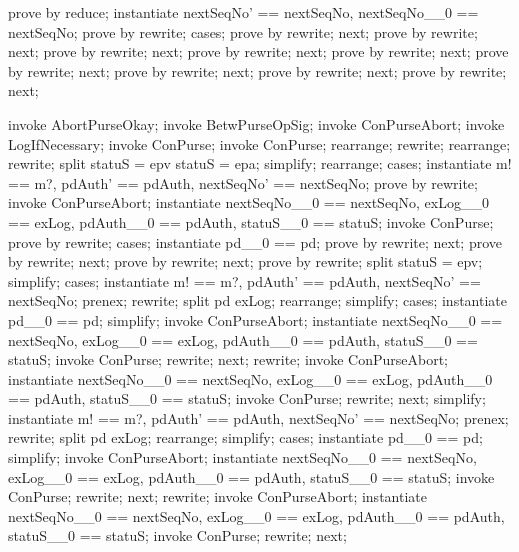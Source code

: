 \begin{LPScript}\begin{zproof}[tIncreasePurseOkayIsTotal]
    prove by reduce;
    instantiate nextSeqNo' == nextSeqNo, nextSeqNo\_\_0 == nextSeqNo;
    prove by rewrite;
    cases;
    prove by rewrite;
    next;
    prove by rewrite;
    next;
    prove by rewrite;
    next;
    prove by rewrite;
    next;
    prove by rewrite;
    next;
    prove by rewrite;
    next;
    prove by rewrite;
    next;
    prove by rewrite;
    next;
    prove by rewrite;
    next;
\end{zproof}\end{LPScript}

\begin{LPScript}\begin{zproof}[tAbortPurseOkayIsTotal]
    invoke AbortPurseOkay;
    invoke BetwPurseOpSig;
    invoke \Xi ConPurseAbort;
    invoke LogIfNecessary;
    invoke \Delta ConPurse;
    invoke ConPurse;
    rearrange;
    rewrite;
    rearrange;
    rewrite;
    split \lnot  statuS = epv \land  \lnot  statuS = epa;
    simplify;
    rearrange;
    cases;
    instantiate m! == m?, pdAuth' == pdAuth, nextSeqNo' == nextSeqNo;
    prove by rewrite;
    invoke ConPurseAbort;
    instantiate nextSeqNo\_\_0 == nextSeqNo, exLog\_\_0 == exLog,
        pdAuth\_\_0 == pdAuth, statuS\_\_0 == statuS;
    invoke ConPurse;
    prove by rewrite;
    cases;
    instantiate pd\_\_0 == pd;
    prove by rewrite;
    next;
    prove by rewrite;
    next;
    prove by rewrite;
    next;
    prove by rewrite;
    split statuS = epv;
    simplify;
    cases;
    instantiate m! == m?, pdAuth' == pdAuth, nextSeqNo' == nextSeqNo;
    prenex;
    rewrite;
    split pd \in  exLog;
    rearrange;
    simplify;
    cases;
    instantiate pd\_\_0 == pd;
    simplify;
    invoke ConPurseAbort;
    instantiate nextSeqNo\_\_0 == nextSeqNo, exLog\_\_0 == exLog,
        pdAuth\_\_0 == pdAuth, statuS\_\_0 == statuS;
    invoke ConPurse;
    rewrite;
    next;
    rewrite;
    invoke ConPurseAbort;
    instantiate nextSeqNo\_\_0 == nextSeqNo, exLog\_\_0 == exLog,
        pdAuth\_\_0 == pdAuth, statuS\_\_0 == statuS;
    invoke ConPurse;
    rewrite;
    next;
    simplify;
    instantiate m! == m?, pdAuth' == pdAuth, nextSeqNo' == nextSeqNo;
    prenex;
    rewrite;
    split pd \in  exLog;
    rearrange;
    simplify;
    cases;
    instantiate pd\_\_0 == pd;
    simplify;
    invoke ConPurseAbort;
    instantiate nextSeqNo\_\_0 == nextSeqNo, exLog\_\_0 == exLog,
        pdAuth\_\_0 == pdAuth, statuS\_\_0 == statuS;
    invoke ConPurse;
    rewrite;
    next;
    rewrite;
    invoke ConPurseAbort;
    instantiate nextSeqNo\_\_0 == nextSeqNo, exLog\_\_0 == exLog,
        pdAuth\_\_0 == pdAuth, statuS\_\_0 == statuS;
    invoke ConPurse;
    rewrite;
    next;
\end{zproof}\end{LPScript}

